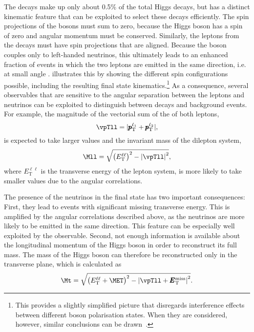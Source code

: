 The \HWWdet decays make up only about 0.5\% of the total Higgs decays, but has a distinct kinematic feature that can be exploited to select these decays efficiently.
The spin projections of the \Wboson bosons must sum to zero, because the Higgs boson has a spin of zero and angular momentum must be conserved.
Similarly, the leptons from the \Wboson decays must have spin projections that are aligned. Because the \Wboson boson couples only to left-handed neutrinos, this ultimately leads to an enhanced fraction of \HWWdet events in which the two leptons are emitted in the same direction, i.e. at small angle \dphill.
 illustrates this by showing the different spin configurations possible, including the resulting final state kinematics.\footnote{This provides a slightly simplified picture that disregards interference effects between different \Wboson boson polarisation states. When they are considered, however, similar conclusions can be drawn~\cite{Maina_2021}.}
As a consequence, several observables that are sensitive to the angular separation between the leptons and neutrinos can be exploited to distinguish between \HWWdet decays and background events. 
For example, the magnitude of the vectorial sum of the \pT of both leptons,
\begin{equation}
    \vpTll = |\pmb{p}_\text{T}^{\ell_1} + \pmb{p}_\text{T}^{\ell_2}|,
\end{equation}
is expected to take larger values and the invariant mass of the dilepton system,
\begin{equation}
    \Mll = \sqrt{\left( E_{\mathrm{T}}^{\ell\ell} \right)^2 - \left| \vpTll \right|^2},
\end{equation}
where $E_{\mathrm{T}}^{\ell\ell}$ is the transverse energy of the lepton system, is more likely to take smaller values due to the angular correlations. 

The presence of the neutrinos in the final state has two important consequences:
First, they lead to events with significant missing transverse energy. This is amplified by the angular correlations described above, as the neutrinos are more likely to be emitted in the same direction. This feature can be especially well exploited by the \METSig observable.
Second, not enough information is available about the longitudinal momentum of the Higgs boson in order to reconstruct its full mass. The mass of the Higgs boson can therefore be reconstructed only in the transverse plane, which is calculated as
\begin{equation}
  \Mt = \sqrt{ \left( E_{\mathrm{T}}^{\ell\ell}+\MET \right)^2 - \left| \vpTll + \pmb{E}_{\text{T}}^{\text{miss}} \right|^2 }.
\end{equation}

